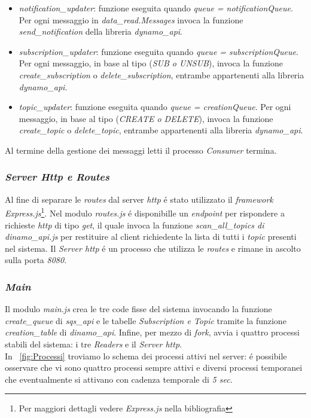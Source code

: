 \documentclass{article}
\begin{document}
\begin{itemize}
\item{\textit{notification\_updater}: funzione eseguita quando \textit{queue = notificationQueue}. Per ogni messaggio in \textit{data\_read.Messages} invoca la funzione \textit{send\_notification} della libreria \textit{dynamo\_api}.}
\item{\textit{subscription\_updater}: funzione eseguita quando \textit{queue = subscriptionQueue}. Per ogni messaggio, in base al tipo (\textit{SUB o UNSUB}), invoca la funzione \textit{create\_subscription} o \textit{delete\_subscription}, entrambe appartenenti alla libreria \textit{dynamo\_api}.}
\item{\textit{topic\_updater}: funzione eseguita quando \textit{queue = creationQueue}. Per ogni messaggio, in base al tipo (\textit{CREATE o DELETE}), invoca la funzione \textit{create\_topic} o \textit{delete\_topic}, entrambe appartenenti alla libreria \textit{dynamo\_api}.}
\end{itemize}

Al termine della gestione dei messaggi letti il processo \textit{Consumer} termina.

\subsubsection{\textit{Server Http e Routes}}
Al fine di separare le \textit{routes} dal server \textit{http} \'e stato utilizzato il \textit{framework Express.js}\footnote{Per maggiori dettagli vedere \textit{Express.js} nella bibliografia}. Nel modulo \textit{routes.js} \'e disponibille un \textit{endpoint} per rispondere a richieste \textit{http} di tipo \textit{get}, il quale invoca la funzione \textit{scan\_all\_topics di dinamo\_api.js} per restituire al client richiedente la lista di tutti i \textit{topic} presenti nel sistema. Il \textit{Server http} \'e un processo che utilizza le \textit{routes} e rimane in ascolto sulla porta \textit{8080}.

\subsubsection{\textit{Main}}
Il modulo \textit{main.js} crea le tre code fisse del sistema invocando la funzione \textit{create\_queue} di \textit{sqs\_api} e le tabelle \textit{Subscription e Topic} tramite la funzione \textit{creation\_table} di \textit{dinamo\_api}. Infine, per mezzo di \textit{fork}, avvia i quattro processi stabili del sistema: i tre \textit{Readers} e il \textit{Server http}. \\
In \figurename{~\ref{fig:Processi}} troviamo lo schema dei processi attivi nel server: \'e possibile osservare che vi sono quattro processi sempre attivi e diversi processi temporanei che eventualmente si attivano con cadenza temporale di \textit{5 sec}.
\end{document}
